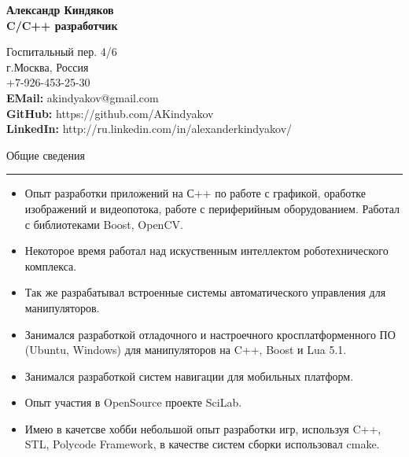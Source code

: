 \documentclass{article}
\begin{document}
{\Large\textbf{Александр Киндяков}}\\
{\large\textbf{C/C++ разработчик}}

\rule{0pt}{5mm}
{\itshape
    \begin{flushright}
    Госпитальный пер. 4/6 \\
    г.Москва, Россия \\
    +7-926-453-25-30 \\
    \textbf{EMail:} akindyakov@gmail.com \\
    \textbf{GitHub:} https://github.com/AKindyakov \\
    \textbf{LinkedIn:} http://ru.linkedin.com/in/alexanderkindyakov/ \\
    \end{flushright}
}

\rule{0pt}{1cm}
{\large{Общие сведения}}
\hrule \smallskip
\begin{itemize}
    \item Опыт разработки приложений на С++ по работе с графикой, оработке
    изображений и видеопотока, работе с периферийным оборудованием. 
    Работал с библиотеками Boost, OpenCV. 
    \item Некоторое время работал над искуственным интеллектом роботехнического комплекса.
    \item Так же разрабатывал встроенные системы автоматического управления для
    манипуляторов. 
    \item Занимался разработкой отладочного и настроечного
    кросплатформенного ПО (Ubuntu, Windows) для манипуляторов на C++, Boost и Lua 5.1. 
    \item Занимался разработкой систем навигации для мобильных платформ.
    \item Опыт участия в OpenSource проекте SciLab.
    \item Имею в качетсве хобби небольшой опыт разработки игр, используя C++, STL,
    Polycode Framework, в качестве систем сборки использовал cmake.
\end{itemize}
\end{document}
